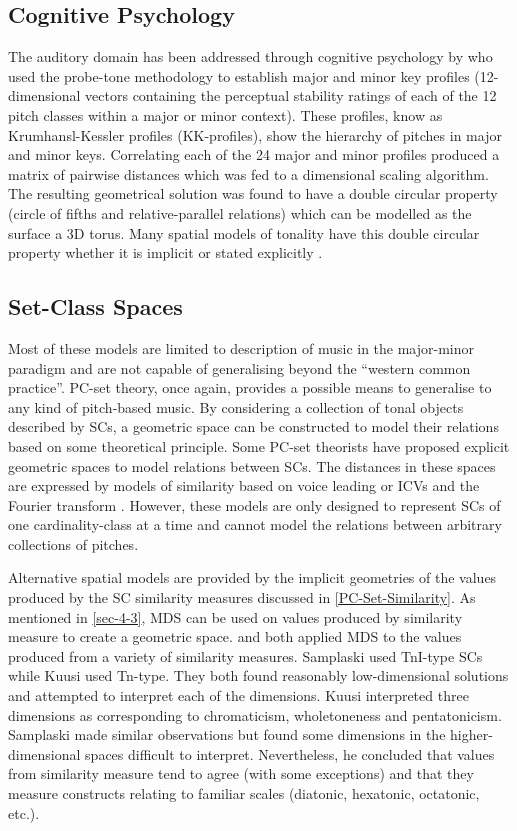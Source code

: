 \documentclass{article}
\begin{document}
\subsection{Cognitive Psychology}
\label{sec-5-3}

The auditory domain has been addressed through cognitive psychology
by \citet{Krumhansl1990} who used the probe-tone methodology
\citep{Krumhansl1979} to establish major and minor key profiles
(12-dimensional vectors containing the perceptual stability ratings of
each of the 12 pitch classes within a major or minor context). These
profiles, know as Krumhansl-Kessler profiles (KK-profiles), show the
hierarchy of pitches in major and minor keys. Correlating each of the
24 major and minor profiles produced a matrix of pairwise distances
which was fed to a dimensional scaling algorithm. The resulting
geometrical solution was found to have a double circular property
(circle of fifths and relative-parallel relations) which can be
modelled as the surface a 3D torus. Many spatial models of tonality
have this double circular property whether it is implicit
\citep{Weber,Schoenberg} or stated explicitly \citep{Lerdahl2001a}.
\subsection{Set-Class Spaces}
\label{sec-5-4}

Most of these models are limited to description of music in the
major-minor paradigm and are not capable of generalising beyond the
``western common practice''. PC-set theory, once again, provides a
possible means to generalise to any kind of pitch-based music. By
considering a collection of tonal objects described by SCs, a
geometric space can be constructed to model their relations based on
some theoretical principle. Some PC-set theorists have proposed
explicit geometric spaces to model relations between SCs. The
distances in these spaces are expressed by models of similarity based
on voice leading \citep{Cohn2003,Tymoczko2012} or ICVs and the Fourier
transform \citep{Quinn2006, Quinn2007}. However, these models are only
designed to represent SCs of one cardinality-class at a time and
cannot model the relations between arbitrary collections of pitches.

Alternative spatial models are provided by the implicit geometries of
the values produced by the SC similarity measures discussed in \ref{PC-Set-Similarity}. As mentioned in \ref{sec-4-3}, MDS can be
used on values produced by similarity measure to create a geometric
space. \citet{Kuusi2001} and \citet{Samplaski2005a} both applied MDS to
the values produced from a variety of similarity measures. Samplaski
used TnI-type SCs while Kuusi used Tn-type. They both found reasonably
low-dimensional solutions and attempted to interpret each of the
dimensions. Kuusi interpreted three dimensions as corresponding to
chromaticism, wholetoneness and pentatonicism. Samplaski made similar
observations but found some dimensions in the higher-dimensional
spaces difficult to interpret. Nevertheless, he concluded that values
from similarity measure tend to agree (with some exceptions) and that
they measure constructs relating to familiar scales (diatonic,
hexatonic, octatonic, etc.).
\end{document}
